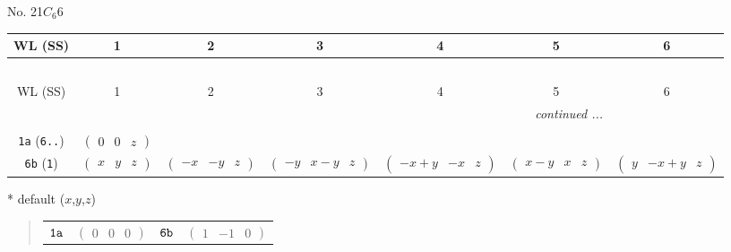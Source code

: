 \documentclass[fleqn,9pt,landscape]{jsarticle}
\begin{document}
\newpage
No. 21\quad$C_{6}$\quad$6$\quad[ hexagonal ]
\begin{center}
\renewcommand{\arraystretch}{1.2}
\begin{longtable}{ccccccc}
 \hline \hline
WL (SS) & 1 & 2 & 3 & 4 & 5 & 6 \\ \hline \endfirsthead

\multicolumn{6}{l}{\tablename\ \thetable{}} \\
 \hline \hline
WL (SS) & 1 & 2 & 3 & 4 & 5 & 6 \\ \hline \endhead

 \hline \hline
\multicolumn{6}{r}{\footnotesize\it continued ...} \\ \endfoot

 \hline \hline
\multicolumn{6}{r}{} \\ \endlastfoot

{\tt 1a} ({\tt 6..}) & $ \begin{pmatrix} 0 & 0 & z \end{pmatrix} $ & $  $ & $  $ & $  $ & $  $ & $  $ \\ \hline
{\tt 6b} ({\tt 1}) & $ \begin{pmatrix} x & y & z \end{pmatrix} $ & $ \begin{pmatrix} - x & - y & z \end{pmatrix} $ & $ \begin{pmatrix} - y & x - y & z \end{pmatrix} $ & $ \begin{pmatrix} - x + y & - x & z \end{pmatrix} $ & $ \begin{pmatrix} x - y & x & z \end{pmatrix} $ & $ \begin{pmatrix} y & - x + y & z \end{pmatrix} $ \\
\end{longtable}
\end{center}
* default ($x$,$y$,$z$)
\begin{quote}
\begin{tabular}{cccc}
$ {\tt 1a} $ & $ \begin{pmatrix} 0 & 0 & 0 \end{pmatrix} $ & $ {\tt 6b} $ & $ \begin{pmatrix} 1 & -1 & 0 \end{pmatrix} $
\end{tabular}
\end{quote}
\end{document}
